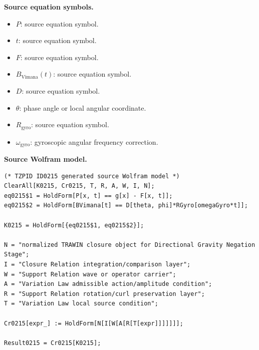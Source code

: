 \begin{minipage}[t]{0.49\linewidth}
\begingroup
\small
\raggedright
\textbf{Source equation symbols.}\par
\begin{itemize}[leftmargin=1.35em,itemsep=1pt,topsep=1pt,parsep=0pt]
    \item $P$: source equation symbol.
    \item $t$: source equation symbol.
    \item $F$: source equation symbol.
    \item $B_{\mathrm{Vimana}}(t)$: source equation symbol.
    \item $D$: source equation symbol.
    \item $\theta$: phase angle or local angular coordinate.
    \item $R_{\mathrm{gyro}}$: source equation symbol.
    \item $\omega_{\mathrm{gyro}}$: gyroscopic angular frequency correction.
\end{itemize}
\endgroup
\end{minipage}\hfill
\begin{minipage}[t]{0.47\linewidth}
\begingroup
\scriptsize
\raggedright
\textbf{Source Wolfram model.}\par
\begin{Verbatim}[fontsize=\tiny,breaklines=true,breakanywhere=true]
(* TZPID ID0215 generated source Wolfram model *)
ClearAll[K0215, Cr0215, T, R, A, W, I, N];
eq0215$1 = HoldForm[P[x, t] == g[x] - F[x, t]];
eq0215$2 = HoldForm[BVimana[t] == D[theta, phi]*RGyro[omegaGyro*t]];

K0215 = HoldForm[{eq0215$1, eq0215$2}];

N = "normalized TRAWIN closure object for Directional Gravity Negation Stage";
I = "Closure Relation integration/comparison layer";
W = "Support Relation wave or operator carrier";
A = "Variation Law admissible action/amplitude condition";
R = "Support Relation rotation/curl preservation layer";
T = "Variation Law local source condition";

Cr0215[expr_] := HoldForm[N[I[W[A[R[T[expr]]]]]]];

Result0215 = Cr0215[K0215];
\end{Verbatim}
\endgroup
\end{minipage}

